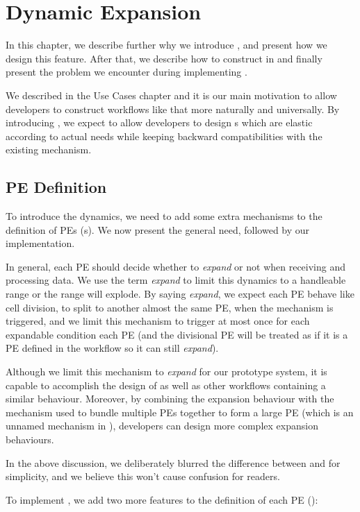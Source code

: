\chapter{Dynamic Expansion}
In this chapter, we describe further why we introduce \tdynexp, and present how we design this feature. After that, we describe how to construct \tsieve in \tdynexp and finally present the problem we encounter during implementing \tdynexp.

We described \tsieve in the Use Cases chapter and it is our main motivation to allow developers to construct workflows like that more naturally and universally. By introducing \tdynexp, we expect to allow developers to design \tPETmpl{}s which are elastic according to actual needs while keeping backward compatibilities with the existing \dpy mechanism.

\section{PE Definition}
To introduce the dynamics, we need to add some extra mechanisms to the definition of PEs (\ie \tPETmpl{}s). We now present the general need, followed by our implementation.

In general, each PE should decide whether to \textit{expand} or not when receiving and processing data. We use the term \textit{expand} to limit this dynamics to a handleable range or the range will explode. By saying \textit{expand}, we expect each PE behave like cell division, to split to another almost the same PE, when the mechanism is triggered, and we limit this mechanism to trigger at most once for each expandable condition each PE (and the divisional PE will be treated as if it is a PE defined in the workflow so it can still \textit{expand}).

Although we limit this mechanism to \textit{expand} for our prototype system, it is capable to accomplish the design of \ttsieve as well as other workflows containing a similar behaviour. Moreover, by combining the expansion behaviour with the mechanism used to bundle multiple PEs together to form a large PE (which is an unnamed mechanism in \dpy), developers can design more complex expansion behaviours.

In the above discussion, we deliberately blurred the difference between \tPETmpl and \tPEInst for simplicity, and we believe this won't cause confusion for readers.

To implement \tdynexp, we add two more features to the definition of each PE (\tPETmpl):

